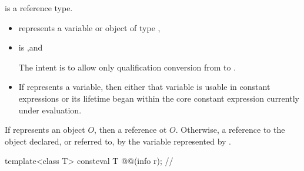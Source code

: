 \begin{itemdescr}
\pnum
\begin{note}
 is a reference type.
\end{note}

\pnum
\constantwhen
\begin{itemize}
\item
   represents a variable or object of type ,
\item
  is ,\newline and
  \begin{note}
  The intent is to allow only qualification conversion from  to .
  \end{note}
\item
  If  represents a variable,
  then either that variable is usable in constant expressions
  or its lifetime began within the core constant expression currently under evaluation.
\end{itemize}

\pnum
\returns
If  represents an object $O$,
then a reference ot $O$.
Otherwise, a reference to the object declared, or referred to,
by the variable represented by .
\end{itemdescr}

\begin{itemdecl}
template<class T>
  consteval T @@(info r);       // \expos
\end{itemdecl}

